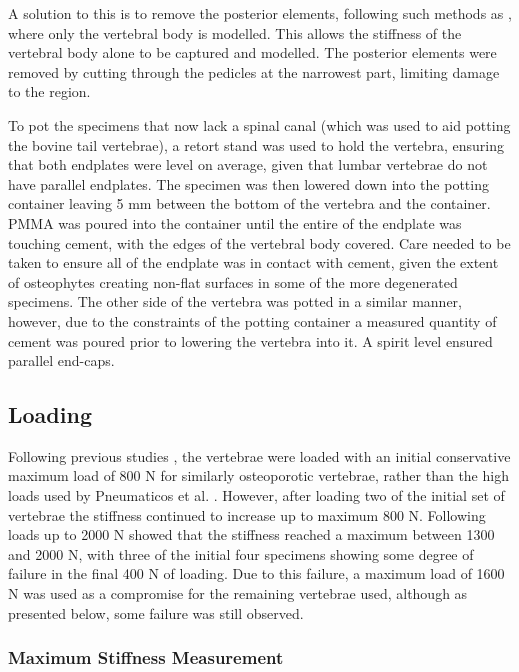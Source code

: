 A solution to this is to remove the posterior elements, following such methods
as \cite{Wijayathunga2008,RobsonBrown2014}, where only the vertebral body is
modelled. This allows the stiffness of the vertebral body alone to be captured
and modelled. The posterior elements were removed by cutting through the
pedicles at the narrowest part, limiting damage to the region.

To pot the specimens that now lack a spinal canal (which was used to aid
potting the bovine tail vertebrae), a retort stand was used to
hold the vertebra, ensuring that both endplates were level on average, given
that lumbar vertebrae do not have parallel endplates. %
The
specimen was then lowered down into the potting container leaving 5 mm between
the bottom of the vertebra and the container. PMMA was poured into the
container
until the entire of the endplate was touching cement, with the edges of the
vertebral body covered. Care needed to be taken to ensure all of the endplate
was in contact with cement, given the extent of osteophytes creating non-flat
surfaces in some of the more degenerated specimens. The other side of the
vertebra was potted in a similar manner, however, due to the constraints of the
potting container a measured quantity of cement was poured prior to lowering
the
vertebra into it. A spirit level ensured parallel end-caps.

\subsection{Loading}

Following previous studies \cite{Wijayathunga2008,furtado2007biomechanical}, the vertebrae were loaded
with an initial conservative maximum load of 800 N for similarly osteoporotic
vertebrae, rather than the high loads used by Pneumaticos et al.
\cite{pneumaticos2013effect}.
However, after loading two of the initial set of vertebrae the stiffness
continued to increase up to maximum 800 N. Following loads up to 2000 N showed
that the stiffness reached a maximum between 1300 and 2000 N, with three of the
initial four specimens showing some degree of failure in the final 400 N of
loading. Due to this failure, a maximum load of 1600 N was used as a compromise
for the remaining vertebrae used, although as presented below, some failure was
still observed.

\subsubsection{Maximum Stiffness Measurement}

